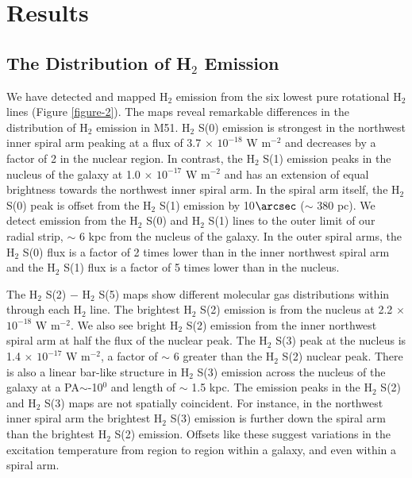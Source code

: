\documentclass[12pt,preprint]{aastex}
\begin{document}
\section{Results}

\subsection{The Distribution of H$_2$ Emission}

We have detected and mapped H$_2$ emission from the six
lowest pure rotational H$_2$ lines (Figure \ref{figure-2}).  The
maps reveal remarkable differences in the distribution of
H$_2$ emission in M51.  H$_2$ S(0) emission is
strongest in the northwest inner spiral arm peaking at a flux of 3.7
$\times$ $\mathrm{10^{-18}}$ W $\mathrm{m^{-2}}$ and decreases by a
factor of 2 in the nuclear region.  In contrast, the H$_2$
S(1) emission peaks in the nucleus of the galaxy at
1.0 $\times$ $\mathrm{10^{-17}}$ W $\mathrm{m^{-2}}$ and has an
extension of equal brightness towards the northwest inner spiral arm.  In the
spiral arm itself, the H$_2$ S(0) peak is offset from the
H$_2$ S(1) emission by 10$\arcsec$ ($\sim$ 380 pc).  
We detect emission from the H$_2$ S(0) and 
H$_2$ S(1) lines to the outer limit of our radial 
strip,  $\sim$ 6 kpc from the nucleus of the galaxy.  In the outer spiral arms,
the H$_2$ S(0) flux is a factor of 2 times lower than in
the inner northwest spiral arm and the H$_2$ S(1) flux
is a factor of 5 times lower than in the nucleus.
 
The $\mathrm{ H_2}$ S(2) $-$ H$_2$ S(5) maps show different
molecular gas distributions within  through each
H$_2$ line.  The brightest H$_2$ S(2) emission is
from the nucleus at 2.2 $\times$ $\mathrm{10^{-18}}$ W
$\mathrm{m^{-2}}$.  We also see bright H$_2$ S(2) emission
from the inner northwest spiral arm at half the flux of the
nuclear peak.  The H$_2$ S(3) peak at the nucleus is 1.4
$\times$ $\mathrm{10^{-17}}$ W $\mathrm{m^{-2}}$, a factor of $\sim$ 6
greater than the H$_2$ S(2) nuclear peak.  There is also a
linear bar-like structure in H$_2$ S(3) emission across the
nucleus of the galaxy at a PA$\sim$-10$^0$ and length of $\sim$ 1.5 kpc. 
The emission peaks in the
H$_2$ S(2) and H$_2$ S(3) maps are not spatially
coincident.  For instance, in the northwest inner spiral arm the brightest
H$_2$ S(3) emission is further down the spiral arm than 
the brightest H$_2$ S(2) emission.  Offsets like
these suggest variations in the excitation temperature from 
region to region within a galaxy, and even within a spiral arm.
\end{document}
